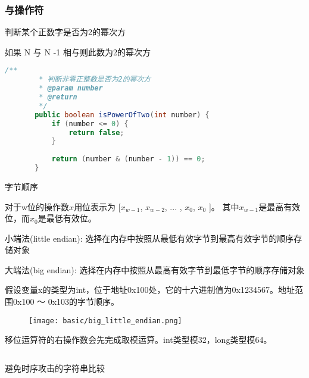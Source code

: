\subsubsection{与操作符}

判断某个正数字是否为2的幂次方

如果 N 与 N -1 相与则此数为2的幂次方

\begin{lstlisting}[language=java]
        /**
        * 判断非零正整数是否为2的幂次方
        * @param number
        * @return
        */
       public boolean isPowerOfTwo(int number) {
           if (number <= 0) {
               return false;
           }
   
           return (number & (number - 1)) == 0;
       }

\end{lstlisting}


字节顺序


对于w位的操作数$x$用位表示为 [$x_{w-1}$, $x_{w-2}$, ... , $x_{0}$, $x_{0}$ ]。
其中$x_{w-1}$是最高有效位，而$x_{0}$是最低有效位。

小端法(little endian): 选择在内存中按照从最低有效字节到最高有效字节的顺序存储对象

大端法(big endian): 选择在内存中按照从最高有效字节到最低字节的顺序存储对象

假设变量x的类型为int，位于地址0x100处，它的十六进制值为0x1234567。地址范围0x100 ～ 0x103的字节顺序。


\begin{figure}[H]
        \centering
        \texttt{[image: basic/big\_little\_endian.png]}
    \end{figure}


移位运算符的右操作数会先完成取模运算。int类型模32，long类型模64。


\begin{lstlisting}[language=java]

\end{lstlisting}




避免时序攻击的字符串比较

